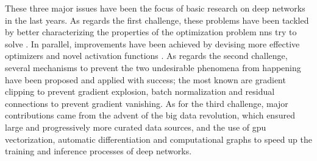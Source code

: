 These three major issues have been the focus of basic research on deep networks in the last years. As regards the first challenge, these problems have been tackled by better characterizing the properties of the optimization problem \glspl{nn} try to solve \citep{goodfellow2015optimization,janocha2017lossfunction}. In parallel, improvements have been achieved by devising more effective optimizers \citep{kingma2015adam,ruder2016overviewsgd} and novel activation functions \citep{glorot2011relu}. As regards the second challenge, several mechanisms to prevent the two undesirable phenomena from happening have been proposed and applied with success; the most known are gradient clipping \citep{zhang2020gradientclipping} to prevent gradient explosion, batch normalization \citep{ioffe2015batchnorm} and residual connections \citep{he2016resnets} to prevent gradient vanishing. As for the third challenge, major contributions came from the advent of the big data revolution, which ensured large and progressively more curated data sources, and the use of \gls{gpu} vectorization, automatic differentiation and computational graphs \citep{abadi2016tensorflow,paszke2017pytorch} to speed up the training and inference processes of deep networks.

